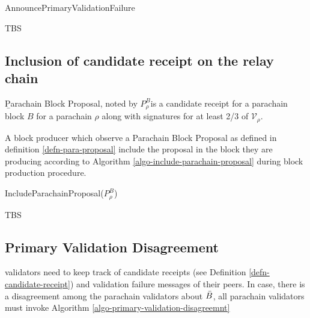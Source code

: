 \begin{algorithm}[H]
  \caption[]{\sc AnnouncePrimaryValidationFailure}
  \label{algo-announce-primary-validation-failure}
  \begin{algorithmic}[1]
    \Require{}

    \State TBS
  \end{algorithmic}
\end{algorithm}

\subsection{Inclusion of candidate receipt on the relay chain}\label{sect-inclusion-of-candidate-receipt}

\begin{definition}
  \label{defn-para-proposal}
        {\b Parachain Block Proposal}, noted by $P^B_{\rho}$is a candidate receipt for a parachain block $B$ for a parachain $\rho$ along with signatures for at least 2/3 of $\mathcal{V}_\rho$.  %

\end{definition}

A block producer which observe a Parachain Block Proposal as defined in definition \ref{defn-para-proposal}  include the proposal in the block they are producing according to Algorithm \ref{algo-include-parachain-proposal} during block production procedure.

\begin{algorithm}[H]
  \caption[]{\sc IncludeParachainProposal($P^B_{\rho}$)}
  \label{algo-include-parachain-proposal}
  \begin{algorithmic}[1]
    \Require{}

    \State TBS
  \end{algorithmic}
\end{algorithm}


\subsection{Primary Validation Disagreement}
\label{sect-primary-validation-disagreemnt}
 validators need to keep track of candidate receipts (see Definition \ref{defn-candidate-receipt}) and validation failure messages of their peers. In case, there is a disagreement among the parachain validators about $\bar{B}$, all parachain validators must invoke Algorithm \ref{algo-primary-validation-disagreemnt}

